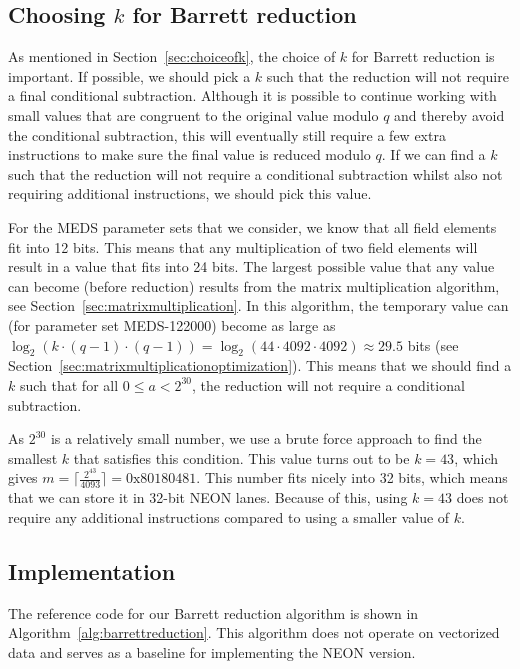 \documentclass[11pt,a4paper]{report}
\theoremstyle{definition}
\begin{document}
\subsection{Choosing \texorpdfstring{$k$}{k} for Barrett reduction}
As mentioned in Section~\ref{sec:choiceofk}, the choice of $k$ for Barrett reduction is important. If possible, we should pick a $k$ such that the reduction will not require a final conditional subtraction. Although it is possible to continue working with small values that are congruent to the original value modulo $q$ and thereby avoid the conditional subtraction, this will eventually still require a few extra instructions to make sure the final value is reduced modulo $q$. If we can find a $k$ such that the reduction will not require a conditional subtraction whilst also not requiring additional instructions, we should pick this value.

For the MEDS parameter sets that we consider, we know that all field elements fit into 12 bits. This means that any multiplication of two field elements will result in a value that fits into 24 bits. The largest possible value that any value can become (before reduction) results from the matrix multiplication algorithm, see Section~\ref{sec:matrixmultiplication}. In this algorithm, the temporary value can (for parameter set MEDS-122000) become as large as $\log_2(k \cdot (q-1) \cdot (q-1)) = \log_2(44 \cdot 4092 \cdot 4092) \approx 29.5$ bits (see Section~\ref{sec:matrixmultiplicationoptimization}). This means that we should find a $k$ such that for all $0 \leq a < 2^{30}$, the reduction will not require a conditional subtraction.

As $2^{30}$ is a relatively small number, we use a brute force approach to find the smallest $k$ that satisfies this condition. This value turns out to be $k = 43$, which gives $m = \lceil \frac{2^{43}}{4093} \rceil = 0\text{x}80180481$. This number fits nicely into 32 bits, which means that we can store it in 32-bit NEON lanes. Because of this, using $k=43$ does not require any additional instructions compared to using a smaller value of $k$.

\subsection{Implementation}
The reference code for our Barrett reduction algorithm is shown in Algorithm~\ref{alg:barrettreduction}. This algorithm does not operate on vectorized data and serves as a baseline for implementing the NEON version.
\end{document}
